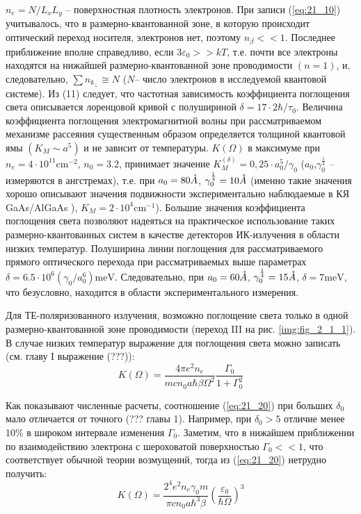 $n_{e} =N/L_{x} L_{y} $ – поверхностная плотность электронов. При записи (\ref{eq:21_10}) учитывалось, что в размерно-квантованной зоне, в которую происходит оптический переход носителя, электронов нет, поэтому  $n_{\beta } <<1$. Последнее приближение вполне справедливо, если  $3\varepsilon _{0} >>kT$, т.е. почти все электроны находятся на нижайшей размерно-квантованной зоне проводимости $(n=1)$, и, следовательно,   $\sum n_{k_{\bot } } \cong N$ ($N$– число электронов в исследуемой квантовой системе). Из (11) следует, что частотная зависимость коэффициента поглощения света описывается лоренцовой кривой с полушириной  $\delta =17\cdot 2\hbar /\tau _{0} $. Величина коэффициента поглощения электромагнитной волны при рассматриваемом механизме рассеяния существенным образом определяется толщиной квантовой ямы $\left(K_{M} \sim a^{5} \right)$ и не зависит от температуры. $K\left(\Omega \right)$  в максимуме при $n_{e} =4\cdot 10^{11} \text{cm}^{-2} $, $n_{0} =3.2$,   принимает значение   $K_{M}^{\left(\delta \right)} =0,25\cdot a_{0}^{5} /\gamma _{0} $ ($a_{0} $,$\gamma _{0}^{\frac{1}{4}} $ – измеряются в ангстремах), т.е. при  $a_{0} = 80 \AA$,  $\gamma _{0}^{\frac{1}{4}} = 10 \AA$ (именно такие значения   хорошо описывают значения подвижности   экспериментально наблюдаемые в КЯ GaAs/AlGaAs \cite{West1985}), $K_{M} =2\cdot 10^{4} \text{cm}^{-1} $). Большие значения коэффициента поглощения света позволяют надеяться на практическое использование таких размерно-квантованных систем в качестве детекторов ИК-излучения в области низких температур. Полуширина линии поглощения для рассматриваемого прямого оптического перехода при рассматриваемых выше параметрах $\delta =6.5\cdot 10^{6} \left(\gamma _{0} /a_{0}^{6} \right)\text{meV}$. Следовательно, при  $a_{0} = 60 \AA$,  $\gamma _{0}^{\frac{1}{4}} = 15 \AA$,  $\delta = 7 \text{meV}$, что безусловно, находится в области экспериментального измерения.

Для ТЕ-поляризованного излучения, возможно поглощение света только в одной размерно-квантованной зоне проводимости (переход III на рис. \ref{img:fig_2_1_1}). В случае низких температур выражение для поглощения света можно записать (см. главу I выражение (???)):
\begin{equation} \label{eq:21_20}
K(\Omega )=\frac{4\pi e^{2} n_{e} }{mcn_{0} a\hbar \beta \Omega ^{2} } \frac{\Gamma _{0} }{1+\Gamma _{0}^{2} }
\end{equation} 

Как показывают численные расчеты, соотношение (\ref{eq:21_20}) при больших $\delta $${}_{0}$ мало отличается от точного (??? главы 1). Например, при $\delta_{0} > 5$ отличие менее 10\% в широком интервале изменения $\Gamma_{0}$. Заметим, что в нижайшем приближении по взаимодействию электрона с шероховатой поверхностью $\Gamma_{0}<<1$, что соответствует обычной теории возмущений, тогда из (\ref{eq:21_20}) нетрудно получить:
\begin{equation} \label{eq:21_30}
K(\Omega )=\frac{2^{4} e^{2} n_{e} \gamma _{0} m}{\pi cn_{0} a\hbar ^{3} \beta } \left(\frac{\varepsilon _{0} }{\hbar \Omega } \right)^{3}
\end{equation} 

